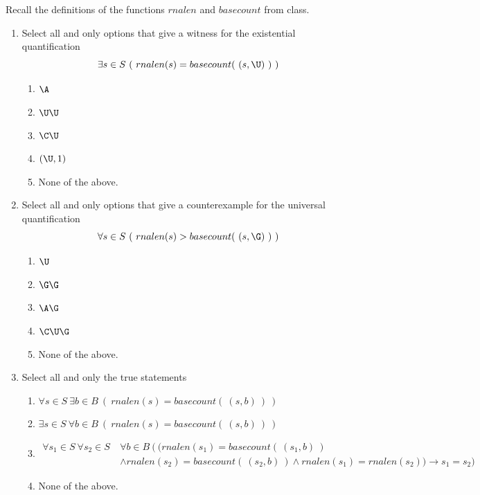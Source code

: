 
Recall the definitions of the functions $rnalen$ and $basecount$ from class.

\begin{enumerate}
    \item Select all and only options that give a witness for the existential quantification
    $$\exists s \in S ~(~rnalen(s) = basecount(~(s,\U)~)~)$$
    \begin{enumerate}
    \item $\A$
    \item $\U\U$
    \item $\C\U$
    \item $(\U, 1)$
    \item None of the above.
    \end{enumerate}
    
    \item Select all and only options that give a counterexample for the universal quantification
    $$\forall s \in S ~(~rnalen(s) > basecount(~(s,\G)~)~)$$
    \begin{enumerate}
    \item $\U$
    \item $\G\G$
    \item $\A\G$
    \item $\C\U\G$
    \item None of the above.
    \end{enumerate}
    
    \item Select all and only the true statements
    \begin{enumerate}
    \item $\forall s \in S ~\exists b \in B ~\left(~rnalen(s) = basecount(~(s,b)~)~ \right)$
    \item $\exists s \in S ~\forall b \in B ~\left(~rnalen(s) = basecount(~(s,b)~)~ \right)$
    \item \begin{align*} \forall s_1 \in S~\forall s_2 \in S ~&\forall b \in B ~\big( ~\big( rnalen(s_1) = basecount(~(s_1,b)~) \\
    &\land rnalen(s_2) = basecount(~(s_2,b)~) \land rnalen(s_1) = rnalen(s_2) \big) \to s_1 = s_2  \big)\end{align*}
    \item None of the above.
    \end{enumerate}
    
\end{enumerate}